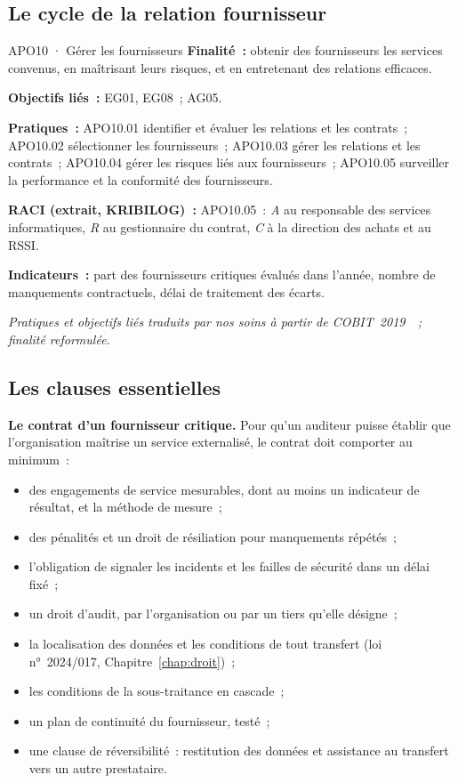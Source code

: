 \subsection{Le cycle de la relation fournisseur}

\begin{boxobjet}{APO10 · Gérer les fournisseurs}
\textbf{Finalité~:} obtenir des fournisseurs les services convenus, en
maîtrisant leurs risques, et en entretenant des relations efficaces.

\textbf{Objectifs liés~:} EG01, EG08~; AG05.

\textbf{Pratiques~:} APO10.01 identifier et évaluer les relations et les
contrats~; APO10.02 sélectionner les fournisseurs~; APO10.03 gérer les
relations et les contrats~; APO10.04 gérer les risques liés aux
fournisseurs~; APO10.05 surveiller la performance et la conformité des
fournisseurs.

\textbf{RACI (extrait, KRIBILOG)~:} APO10.05~: \emph{A} au responsable des
services informatiques, \emph{R} au gestionnaire du contrat, \emph{C} à la
direction des achats et au RSSI.

\textbf{Indicateurs~:} part des fournisseurs critiques évalués dans
l'année, nombre de manquements contractuels, délai de traitement des
écarts.
\end{boxobjet}
{\small\itshape Pratiques et objectifs liés traduits par nos soins à partir
de COBIT~2019~\cite{isaca2018cobitobjectifs}~; finalité reformulée.}

\subsection{Les clauses essentielles}

\begin{boxprocedure}
\textbf{Le contrat d'un fournisseur critique.} Pour qu'un auditeur puisse
établir que l'organisation maîtrise un service externalisé, le contrat
doit comporter au minimum~:
\begin{itemize}
    \item des engagements de service mesurables, dont au moins un
          indicateur de résultat, et la méthode de mesure~;
    \item des pénalités et un droit de résiliation pour manquements
          répétés~;
    \item l'obligation de signaler les incidents et les failles de sécurité
          dans un délai fixé~;
    \item un droit d'audit, par l'organisation ou par un tiers qu'elle
          désigne~;
    \item la localisation des données et les conditions de tout transfert
          (loi n°~2024/017, Chapitre~\ref{chap:droit})~;
    \item les conditions de la sous-traitance en cascade~;
    \item un plan de continuité du fournisseur, testé~;
    \item une clause de réversibilité~: restitution des données et
          assistance au transfert vers un autre prestataire.
\end{itemize}
\end{boxprocedure}

